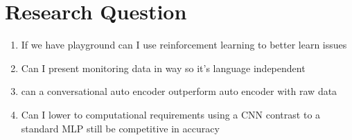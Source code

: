 \section{Research Question}
\begin{enumerate}
\item If we have playground can I use reinforcement learning to better learn issues
\item Can I present monitoring data in way so it's language independent
\item can a conversational auto encoder outperform auto encoder with raw data
\item Can I lower to computational requirements using a CNN contrast to a standard MLP still be competitive in accuracy
\end{enumerate}
